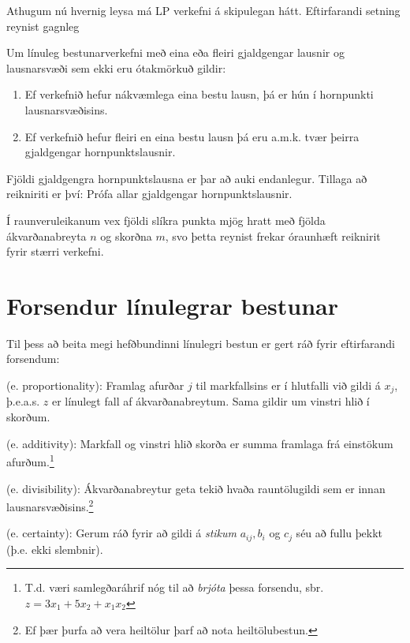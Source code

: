Athugum nú hvernig leysa má LP verkefni á skipulegan hátt. Eftirfarandi setning reynist gagnleg

\begin{setn}
Um línuleg bestunarverkefni með eina eða fleiri gjaldgengar lausnir og lausnarsvæði sem ekki eru ótakmörkuð gildir:
\begin{enumerate}
 \item Ef verkefnið hefur nákvæmlega eina bestu lausn, þá er hún í hornpunkti lausnarsvæðisins.
 \item Ef verkefnið hefur fleiri en eina bestu lausn þá eru a.m.k. tvær þeirra gjaldgengar hornpunktslausnir.
\end{enumerate}
\end{setn}
Fjöldi gjaldgengra hornpunktslausna er þar að auki endanlegur. 
Tillaga að reikniriti er því: 
Prófa allar gjaldgengar hornpunktslausnir.

\begin{aths}
 Í raunveruleikanum vex fjöldi slíkra punkta mjög hratt með fjölda ákvarðanabreyta $n$ og skorðna $m$, svo þetta reynist frekar óraunhæft reiknirit fyrir stærri verkefni.
\end{aths}


\section{Forsendur línulegrar bestunar}
Til þess að beita megi hefðbundinni línulegri bestun er gert ráð fyrir eftirfarandi forsendum:
\begin{description}
\item {} (e. proportionality): Framlag afurðar $j$ til markfallsins er í hlutfalli við gildi á $x_j$, þ.e.a.s. $z$ er línulegt fall af ákvarðanabreytum. Sama gildir um vinstri hlið í skorðum. 
\item {} (e. additivity): Markfall og vinstri hlið skorða er summa framlaga frá einstökum afurðum.\footnote{
T.d. væri samlegðaráhrif nóg til að \emph{brjóta} þessa forsendu, sbr. \mbox{$z=3x_1+5x_2+x_1x_2$}}
\item {} (e. divisibility): Ákvarðanabreytur geta tekið hvaða rauntölugildi sem er innan lausnarsvæðisins.\footnote{
Ef þær þurfa að vera heiltölur þarf að nota heiltölubestun.}
\item {} (e. certainty): Gerum ráð fyrir að gildi á \emph{stikum} $a_{ij}, b_i$ og $c_j$ séu að fullu þekkt (þ.e. ekki slembnir).
\end{description}

